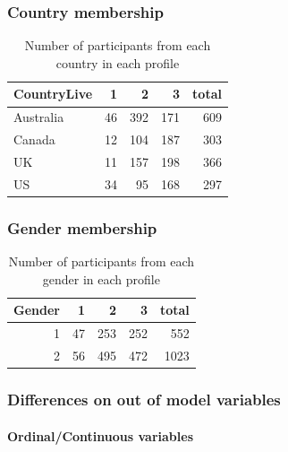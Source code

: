 \documentclass[]{article}
\let\oldparagraph\paragraph
\renewcommand{\paragraph}[1]{\oldparagraph{#1}\mbox{}}
\begin{document}
\hypertarget{country-membership-1}{%
\subsubsection{Country membership}\label{country-membership-1}}

\begin{table}[H]

\caption{\label{tab:unnamed-chunk-15}Number of participants from each country in each profile}
\centering
\fontsize{6}{8}\selectfont
\begin{tabular}[t]{lrrrr}
\toprule
CountryLive & 1 & 2 & 3 & total\\
\midrule
Australia & 46 & 392 & 171 & 609\\
Canada & 12 & 104 & 187 & 303\\
UK & 11 & 157 & 198 & 366\\
US & 34 & 95 & 168 & 297\\
\bottomrule
\end{tabular}
\end{table}

\hypertarget{gender-membership-1}{%
\subsubsection{Gender membership}\label{gender-membership-1}}

\begin{table}[H]

\caption{\label{tab:unnamed-chunk-16}Number of participants from each gender in each profile}
\centering
\fontsize{6}{8}\selectfont
\begin{tabular}[t]{rrrrr}
\toprule
Gender & 1 & 2 & 3 & total\\
\midrule
1 & 47 & 253 & 252 & 552\\
2 & 56 & 495 & 472 & 1023\\
\bottomrule
\end{tabular}
\end{table}

\newpage

\hypertarget{differences-on-out-of-model-variables-1}{%
\subsubsection{Differences on out of model
variables}\label{differences-on-out-of-model-variables-1}}

\hypertarget{ordinalcontinuous-variables-1}{%
\paragraph{Ordinal/Continuous
variables}\label{ordinalcontinuous-variables-1}}
\end{document}
